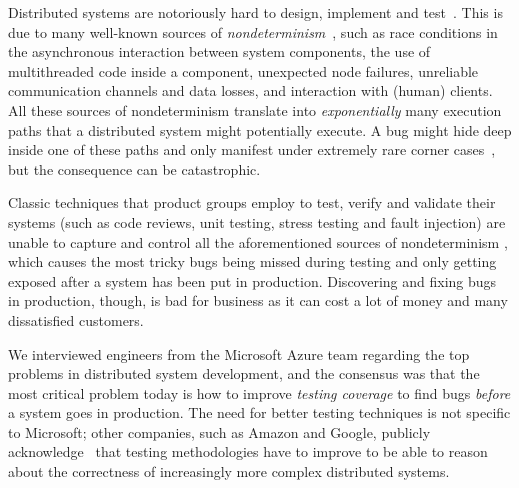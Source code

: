 Distributed systems are notoriously hard to design, implement and test~\cite{cavage2013there, laguna2015debugging, maddox2015test}. This is due to many well-known sources of \emph{nondeterminism}~\cite{chandra2007paxos}, such as race conditions in the asynchronous interaction between system components, the use of multithreaded code inside a component, unexpected node failures, unreliable communication channels and data losses, and interaction with (human) clients.
%
All these sources of nondeterminism translate into \emph{exponentially} many execution paths that a distributed system might potentially execute. A bug might hide deep inside one of these paths and only manifest under extremely rare corner cases~\cite{gray1986computers, musuvathi2008finding}, but the consequence can be catastrophic.

Classic techniques that product groups employ to test, verify and validate their systems (such as code reviews, unit testing, stress testing and fault injection) are unable to capture and control all the aforementioned sources of nondeterminism  , which causes the most tricky bugs being missed during testing and only getting exposed after a system has been put in production. Discovering and fixing bugs in production, though, is bad for business as it can cost a lot of money and many dissatisfied customers.  

We interviewed engineers from the Microsoft Azure team regarding the top problems in distributed system development, and the consensus was that the most critical problem today is how to improve \emph{testing coverage} to find bugs \emph{before} a system goes in production. The need for better testing techniques is not specific to Microsoft; other companies, such as Amazon and Google, publicly acknowledge~\cite{newcombe2015aws} that testing methodologies have to improve to be able to reason about the correctness of increasingly more complex distributed systems. 


